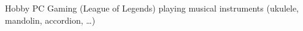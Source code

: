 \versionLanguageStart%
\begin{rubric}{\textcolor{black!20!blue!100}{Hobby}}%
	\entry*
		PC Gaming (League of Legends)
	\entry*
		playing musical instruments (ukulele, mandolin, accordion, \ldots)
\end{rubric}
\versionLanguageEnd